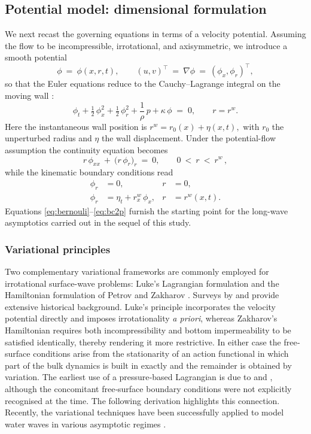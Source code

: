 \documentclass[alpha-refs, 12pt]{wiley-article}
\begin{document}
\subsection{Potential model: dimensional formulation}

We next recast the governing equations in terms of a velocity potential. Assuming the flow to be incompressible, irrotational, and axisymmetric, we introduce a smooth potential
\[
  \phi\ =\ \phi(x,r,t),\qquad
  (u,v)^{\top}\ =\ \nabla\phi\ =\ (\phi_{x},\phi_{r})^{\top},
\]
so that the Euler equations reduce to the Cauchy--Lagrange integral on the moving wall \cite{Mitsotakis2019}:
\begin{equation}\label{eq:bernouli}
  \phi_{t}
  +\tfrac{1}{2}\,\phi_{x}^{2}
  +\tfrac{1}{2}\,\phi_{r}^{2}
  +\frac{1}{\rho}\,p
  +\kappa\,\phi
  \;=\;0,
  \qquad
  r=r^{w}.
\end{equation}
Here the instantaneous wall position is
\(
  r^{w}=r_{0}(x)+\eta(x,t),
\)
with $r_{0}$ the unperturbed radius and $\eta$ the wall displacement. Under the potential-flow assumption the continuity equation becomes
\begin{equation}\label{eq:massp}
  r\,\phi_{xx}\ +\ \bigl(r\,\phi_{r}\bigr)_{r}\ =\ 0, \qquad 0\ <\ r\ <\ r^{w}\,,
\end{equation}
while the kinematic boundary conditions read
\begin{align}
  \phi_{r}&=0,
  & r&=0, \label{eq:bc1p}\\[2pt]
  \phi_{r}&=\eta_{t}+r^{w}_{x}\,\phi_{x},
  & r&=r^{w}(x,t).\label{eq:bc2p}
\end{align}
Equations \eqref{eq:bernouli}--\eqref{eq:bc2p} furnish the starting point for the long-wave asymptotics carried out in the sequel of this study.

\subsubsection{Variational principles}
\label{sec:var_principles}

Two complementary variational frameworks are commonly employed for irrotational surface-wave problems: Luke's Lagrangian formulation \cite{Luke1967} and the Hamiltonian formulation of Petrov and Zakharov \cite{Petrov1964, Zakharov1968}. Surveys by \cite{Radder1999} and \cite{Zakharov1997} provide extensive historical background. Luke's principle incorporates the velocity potential directly and imposes irrotationality \emph{a priori}, whereas Zakharov's Hamiltonian requires both incompressibility and bottom impermeability to be satisfied identically, thereby rendering it more restrictive. In either case the free‐surface conditions arise from the stationarity of an action functional in which part of the bulk dynamics is built in exactly and the remainder is obtained by variation. The earliest use of a pressure‐based Lagrangian is due to \cite{Clebsch1859} and \cite{Hargreaves1908}, although the concomitant free‐surface boundary conditions were not explicitly recognised at the time. The following derivation highlights this connection. Recently, the variational techniques have been successfully applied to model water waves in various asymptotic regimes \cite{Clamond2009,Clamond2024}.
\end{document}
